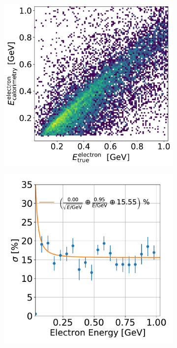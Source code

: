 \documentclass[a4paper]{article}
\begin{document}
\begin{figure}[H] 
\begin{center}
    \begin{subfigure}[b]{0.4\textwidth}
    \centering
    \includegraphics[width=1.00\textwidth]{ereco/electron_eres2D.pdf}
    \end{subfigure}
    \begin{subfigure}[b]{0.38\textwidth}
    \centering
    \includegraphics[width=1.00\textwidth]{ereco/elec_eres_vs_true.pdf}

\end{subfigure}
\end{center}
\end{figure}
\end{document}
